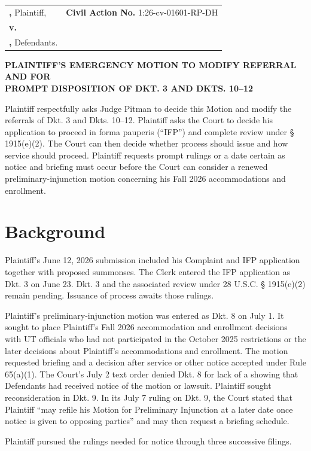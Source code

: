 \documentclass[12pt]{article}
\makeatletter
\renewcommand{\FilingCivilActionNumber}{1:26-cv-01601-RP-DH}
\newcommand{\Caption}{%
  \begin{singlespace}
  \begin{center}
  \textbf{\FilingCourtName}\\
  \textbf{\FilingDistrictName}\\
  \textbf{\FilingDivisionName}
  \end{center}

  \vspace{0.45em}

  \noindent
  \begin{tabularx}{\textwidth}{@{}>{\raggedright\arraybackslash}X>{\raggedright\arraybackslash}p{2.95in}@{}}
  \textbf{\FilingPlaintiffNameUpper,} Plaintiff, & \textbf{Civil Action No.} \FilingCivilActionNumber \\
  \textbf{v.} & \\
  \textbf{\FilingDefendantsInlineUpper,} Defendants. & \\
  \end{tabularx}

  \vspace{1.0em}
  \end{singlespace}%
}
\makeatother
\begin{document}
\Caption

\begin{singlespace}
\begin{center}
\textbf{PLAINTIFF'S EMERGENCY MOTION TO MODIFY REFERRAL AND FOR}\\
\textbf{PROMPT DISPOSITION OF DKT. 3 AND DKTS. 10--12}
\end{center}
\end{singlespace}

Plaintiff \FilingPlaintiffName{} respectfully asks Judge Pitman to decide this Motion and modify the referrals of Dkt. 3 and Dkts. 10--12. Plaintiff asks the Court to decide his application to proceed in forma pauperis (``IFP'') and complete review under § 1915(e)(2). The Court can then decide whether process should issue and how service should proceed. Plaintiff requests prompt rulings or a date certain as notice and briefing must occur before the Court can consider a renewed preliminary-injunction motion concerning his Fall 2026 accommodations and enrollment.

\section*{Background}

Plaintiff's June 12, 2026 submission included his Complaint and IFP application together with proposed summonses. The Clerk entered the IFP application as Dkt. 3 on June 23. Dkt. 3 and the associated review under 28 U.S.C. § 1915(e)(2) remain pending. Issuance of process awaits those rulings.

Plaintiff's preliminary-injunction motion was entered as Dkt. 8 on July 1. It sought to place Plaintiff's Fall 2026 accommodation and enrollment decisions with UT officials who had not participated in the October 2025 restrictions or the later decisions about Plaintiff's accommodations and enrollment. The motion requested briefing and a decision after service or other notice accepted under Rule 65(a)(1). The Court's July 2 text order denied Dkt. 8 for lack of a showing that Defendants had received notice of the motion or lawsuit. Plaintiff sought reconsideration in Dkt. 9. In its July 7 ruling on Dkt. 9, the Court stated that Plaintiff ``may refile his Motion for Preliminary Injunction at a later date once notice is given to opposing parties'' and may then request a briefing schedule.

Plaintiff pursued the rulings needed for notice through three successive filings.
\end{document}
